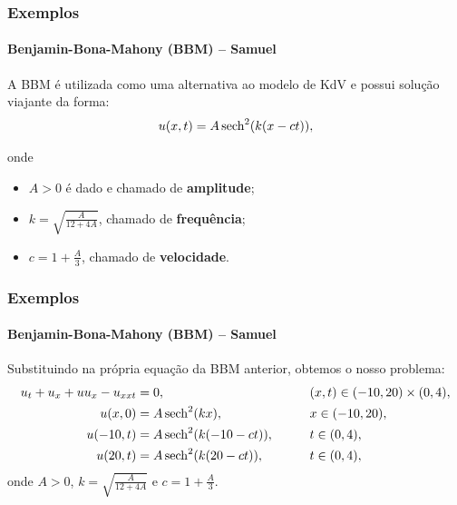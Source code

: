 \documentclass[usenames,dvipsnames,brazil,aspectratio=169]{beamer}
\begin{document}
\begin{frame}[t]
    \frametitle{Exemplos}
    \framesubtitle{Benjamin-Bona-Mahony (BBM) -- Samuel}

    A BBM é utilizada como uma alternativa ao modelo de KdV e possui solução viajante da forma:
    \begin{alignat*}{2}
        u(x,t) = A\sech^2(k(x - ct)),
    \end{alignat*}

    onde 

    \begin{itemize}
        \small
        \item<+-> $A > 0$ é dado e chamado de \textbf{amplitude};
        \item<+-> $k = \displaystyle \sqrt{\frac{A}{12+4A}}$, chamado de \textbf{frequência};
        \item<+-> $c = 1 + \displaystyle \frac{A}{3}$, chamado de \textbf{velocidade}.
    \end{itemize}
\end{frame}

\begin{frame}[t]
    \frametitle{Exemplos}
    \framesubtitle{Benjamin-Bona-Mahony (BBM) -- Samuel}

    Substituindo na própria equação da BBM anterior, obtemos o nosso problema:
    \begin{alignat*}{2}
        u_t + u_x + u u_x - u_{xxt} &= 0, &\qquad& (x,t) \in  (-10, 20) \times (0,4),\\
        u(x,0) &= A\sech^2(kx), &\qquad& x \in (-10, 20),\\
        u(-10,t) &= A\sech^2(k(-10 - ct)),&\qquad& t \in (0,4), \\
        u(20,t) &= A\sech^2(k(20 - ct)), &\qquad& t \in (0,4),
    \end{alignat*}
    onde $A > 0$, $k = \displaystyle \sqrt{\frac{A}{12+4A}}$ e $c = 1 + \displaystyle \frac{A}{3}$.
\end{frame}
\end{document}
